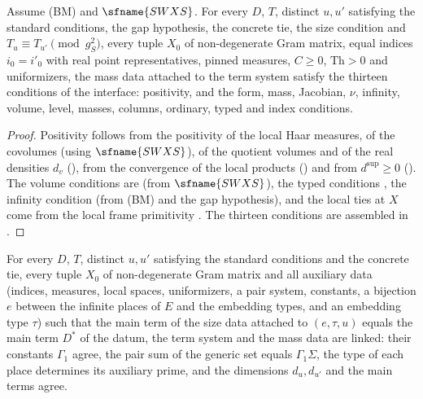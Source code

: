 \begin{proposition}\label{pf:thmS-leaves:prop:massdata}
Assume \textup{(BM)} and $\sfname{SWXS}$. For every $D$, $T$, distinct $u,u'$ satisfying the standard conditions, the gap hypothesis, the
concrete tie, the size condition and $T_u\equiv T_{u'}\pmod{g_S^2}$, every tuple $X_0$ of non-degenerate Gram matrix, equal indices
$i_0=i'_0$ with real point representatives, pinned measures, $C\ge0$, $\mathrm{Th}>0$ and uniformizers, the mass data attached to the
term system satisfy the
thirteen conditions of the interface: positivity, and the form, mass, Jacobian, $\nu$, infinity, volume, level, masses, columns,
ordinary, typed and index conditions.
\end{proposition}

\begin{proof}
Positivity follows from the positivity of the local Haar measures, of the covolumes (using $\sfname{SWXS}$), of the quotient volumes and
of the real densities $d_v$ (), from the convergence of the local products
() and from $d^{\sup}\ge0$
(). The volume conditions are
 (from $\sfname{SWXS}$), the typed conditions
, the infinity condition
 (from \textup{(BM)} and the gap hypothesis), and the local
ties at $X$ come from the local frame primitivity . The thirteen conditions are assembled in
.
\end{proof}

\begin{proposition}\label{pf:thmS-leaves:prop:link}
For every $D$, $T$, distinct $u,u'$ satisfying the standard conditions and the concrete tie, every tuple $X_0$ of non-degenerate Gram
matrix and all auxiliary data (indices, measures, local spaces, uniformizers, a pair system, constants, a bijection $e$ between the
infinite places of $E$ and the embedding types, and an embedding type $\tau$) such that the main term of the size data attached to
$(e,\tau,u)$ equals the main term $D^*$ of the datum, the term system and the mass data are linked: their constants $\Gamma_1$ agree,
the pair sum of the generic set equals
$\Gamma_1\Sigma$, the type of each place determines its auxiliary prime, and the dimensions $d_u,d_{u'}$ and the main terms agree.
\end{proposition}

